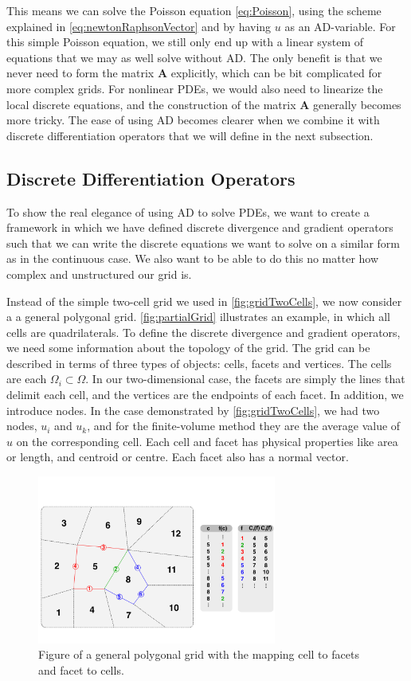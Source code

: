 This means we can solve the Poisson equation \eqref{eq:Poisson}, using the scheme explained in \eqref{eq:newtonRaphsonVector} and by having $u$ as an AD-variable. For this simple Poisson equation, we still only end up with a linear system of equations that we may as well solve without AD. The only benefit is that we never need to form the matrix $\mathbf{A}$ explicitly, which can be bit complicated for more complex grids. For nonlinear PDEs, we would also need to linearize the local discrete equations, and the construction of the matrix \textbf{A} generally becomes more tricky.  The ease of using AD becomes clearer when we combine it with discrete differentiation operators that we will define in the next subsection.

\subsection{Discrete Differentiation Operators}
\label{sec:DiscreteOperators}
To show the real elegance of using AD to solve PDEs, we want to create a framework in which we have defined discrete divergence and gradient operators such that we can write the discrete equations we want to solve on a similar form as in the continuous case. We also want to be able to do this no matter how complex and unstructured our grid is.

Instead of the simple two-cell grid we used in \autoref{fig:gridTwoCells}, we now consider a a general polygonal grid. \autoref{fig:partialGrid} illustrates an example, in which all cells are quadrilaterals. To define the discrete divergence and gradient operators, we need some information about the topology of the grid. The grid can be described in terms of three types of objects: cells, facets and vertices. The cells are each $\Omega_i \subset \Omega$. In our two-dimensional case, the facets are simply the lines that delimit each cell, and the vertices are the endpoints of each facet. In addition, we introduce nodes. In the case demonstrated by \autoref{fig:gridTwoCells}, we had two nodes, $u_i$ and $u_k$, and for the finite-volume method they are the average value of $u$ on the corresponding cell. Each cell and facet has physical properties like area or length, and centroid or centre. Each facet also has a normal vector. 
\begin{figure}[H]
    \centering
    \includegraphics[width = 0.7\textwidth]{figures/grid_cells_facets.pdf}
    \caption{Figure of a general polygonal grid with the mapping cell to facets and facet to cells.}
    \label{fig:partialGrid}
\end{figure}

